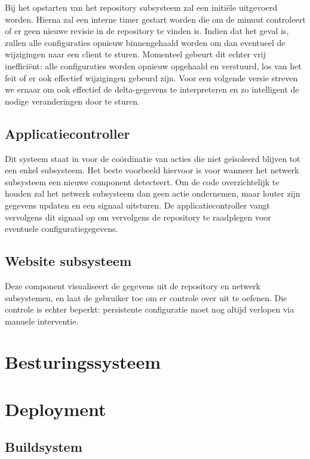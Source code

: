 Bij het opstarten van het repository subsysteem zal een initiële  uitgevoerd worden. Hierna zal een interne timer gestart worden die om de minuut controleert of er geen nieuwe revisie in de repository te vinden is. Indien dat het geval is, zullen alle configuraties opnieuw binnengehaald worden om dan eventueel de wijzigingen naar een client te sturen. Momenteel gebeurt dit echter vrij inefficiënt: alle configuraties worden opnieuw opgehaald en verstuurd, los van het feit of er ook effectief wijzigingen gebeurd zijn. Voor een volgende versie streven we ernaar om ook effectief de delta-gegevens te interpreteren en zo intelligent de nodige veranderingen door te sturen.

\section{Applicatiecontroller}

Dit systeem staat in voor de coördinatie van acties die niet geïsoleerd blijven tot een enkel subsysteem. Het beste voorbeeld hiervoor is voor wanneer het netwerk subsysteem een nieuwe component detecteert. Om de code overzichtelijk te houden zal het netwerk subsysteem dan geen actie ondernemen, maar louter zijn gegevens updaten en een signaal uitsturen. De applicatiecontroller vangt vervolgens dit signaal op om vervolgens de repository te raadplegen voor eventuele configuratiegegevens.

\section{Website subsysteem}

Deze component visualiseert de gegevens uit de repository en netwerk subsystemen, en laat de gebruiker toe om er controle over uit te oefenen. Die controle is echter beperkt: persistente configuratie moet nog altijd verlopen via manuele interventie.

\chapter{Besturingssysteem}


\chapter{Deployment}

\section{Buildsystem}


